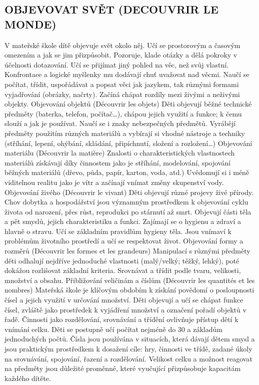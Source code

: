 	\subsection{OBJEVOVAT SVĚT (DECOUVRIR LE MONDE)}
		V mateřské škole dítě objevuje svět okolo něj. Učí se prostorovým a časovým omezením a jak se jim přizpůsobit. Pozoruje, klade otázky a dělá pokroky v účelnosti dotazování. Učí se přijímat jiný pohled na věc, než svůj vlastní.  Konfrontace a logické myšlenky mu dodávají chuť uvažovat nad věcmi. Naučí se počítat, třídit, uspořádávat a popsat věci jak jazykem, tak různými formami vyjadřování (obrázky, načrty). Začíná chápat rozdíly mezi živými a neživými objekty.
		Objevování objektů (Découvrir les objets)
		Děti objevují běžné technické předměty (baterka, telefon, počítač…), chápou jejich využití a funkce; k čemu slouží a jak je používat. Naučí se i znaky nebezpečných předmětů.
		Vyrábějí předměty použitím různých materiálů a vybírají si vhodné nástroje a techniky (stříhání, lepení, ohýbání, skládání, připíchnutí, složení a rozložení…)
		Objevování materiálu (Découvrir la matière)
		Znalosti o charakteristických vlastnostech materiálů získávají díky činnostem jako je stříhání, modelování, spojování běžných materiálů (dřevo, půda, papír, karton, voda, atd.)
		Uvědomují si i méně viditelnou realitu jako je vítr a začínají vnímat změny skupenství vody. 
		Objevování živého (Découvrir le vivant) 
		Děti objevují různé projevy živé přírody. Chov dobytka a hospodářství jsou významným prostředkem k objevování cyklu života od narození, přes růst, reprodukci po stárnutí až smrt.
		Objevují části těla a pět smyslů, jejich charakteristiku a funkci. Zajímají se o hygienu a zdraví a hlavně o stravu. Učí se základním pravidlům hygieny těla. 
		Jsou vnímaví k problémům životního prostředí a učí se respektovat život. 
		Objevování formy a rozměrů (Découvrir les formes et les grandeurs)
		Manipulací s různými předměty děti odhalují nejdříve jednoduché vlastnosti (malý/velký; těžký, lehký), poté dokážou rozlišovat základní kriteria. Srovnávat a třídit podle tvaru, velikosti, množství a obsahu.
		Přibližování veličinám a číslům (Découvrir les quantités et les nombres)
		Mateřská škole je klíčovým obdobím k získání povědomí o posloupnosti čísel a jejich využití v určování množství. Děti objevují a učí se chápat funkce čísel, zvláště jako prostředek k vyjádření množství a označení pořadí objektů v řadě.
		Činnosti jako rozdělování, srovnávání a třídění ovlivňuje přístup dětí k vnímání celku. Děti se postupně učí počítat nejméně do 30 a základům jednoduchých počtů.
		Čísla jsou používána v situacích, která dávají dětem smysl a jsou praktickým prostředkem k dosažení cíle: hry, činnosti ve třídě, zadané úkoly na srovnávání, spojování, řazení a rozdělování. Velikost celku a možnost reagovat na předměty jsou důležité proměnné, které vyučující přizpůsobuje kapacitám každého dítěte. 
